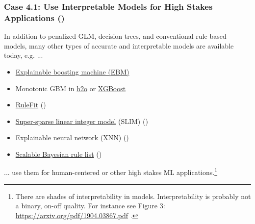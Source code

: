 \documentclass[11pt,aspectratio=169,hyperref={colorlinks}]{beamer}
\begin{document}
	\begin{frame}


		\frametitle{\normalsize{\textbf{Case 4.1}: Use \textbf{Interpretable Models} for High Stakes Applications (\citet{please_stop})}}
		
		In addition to penalized GLM, decision trees, and conventional rule-based models, many other types of accurate and interpretable models are available today, e.g. ...
		
		\begin{itemize}
			\item \href{https://github.com/microsoft/interpret}{Explainable boosting machine (EBM)}
			\item Monotonic GBM in \href{https://github.com/h2oai/h2o-3}{h2o} or \href{https://github.com/dmlc/xgboost}{XGBoost}
			\item \href{https://cran.r-project.org/web/packages/pre/index.html}{RuleFit} (\citet{rulefit})
			\item \href{https://github.com/ustunb/slim-python}{Super-sparse linear integer model} (SLIM)	(\citet{slim})
			\item Explainable neural network (XNN) (\citet{wf_xnn})
			\item \href{https://cran.r-project.org/web/packages/sbrl/index.html}{Scalable Bayesian rule list} (\citet{sbrl})
		\end{itemize}	

		... use them for human-centered or other high stakes ML applications.\footnote{\tiny{There are shades of interpretability in models. Interpretability is probably not a binary, on-off quality. For instance see Figure 3: \url{https://arxiv.org/pdf/1904.03867.pdf} \cite{molnar2019quantifying}.}}
	
	\end{frame}	
\end{document}
